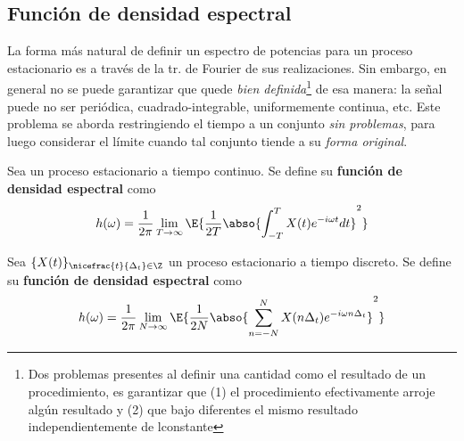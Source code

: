 
\subsection{Función de densidad espectral}

La forma más natural de definir un espectro de potencias para un proceso estacionario 
es a través de la tr. de Fourier de sus realizaciones. Sin embargo, en general no se puede 
garantizar que quede \textit{bien definida}\footnote{Dos problemas presentes al definir una cantidad 
como el resultado de un procedimiento, es garantizar que (1) el procedimiento efectivamente arroje 
algún resultado y (2) que bajo diferentes 
el mismo resultado 
independientemente de lconstante} de esa manera: la señal puede no ser periódica, 
cuadrado-integrable, uniformemente continua, etc.
%
Este problema se aborda restringiendo el tiempo a un conjunto \textit{sin problemas}, para luego
considerar el límite cuando tal conjunto tiende a su \textit{forma original}.

\begin{definicion}%
Sea \xt un proceso estacionario a tiempo continuo. Se define su \textbf{función de densidad 
espectral} como
\begin{equation}
h(\omega) = \frac{1}{2 \pi} \lim_{T\rightarrow \infty} \E{ \frac{1}{2T} 
\abso{ \int_{-T}^{T} X(t) e^{-i \omega t} dt}^{2} }
\label{txt_FDE_cont}
\end{equation}
\end{definicion}

\begin{definicion}%
Sea $\{X(t)\}_{\nicefrac{t}{\Delta_t}\in \Z}$ un proceso estacionario a tiempo discreto. Se 
define su \textbf{función de densidad espectral} como
\begin{equation}
h(\omega) = \frac{1}{2 \pi} \lim_{N\rightarrow \infty} \E{ \frac{1}{2N} 
\abso{ \sum_{n=-N}^{N} X(n \Delta_t) e^{-i \omega n \Delta_t}}^{2} }
\label{txt_FDE_disc}
\end{equation}
\end{definicion}

